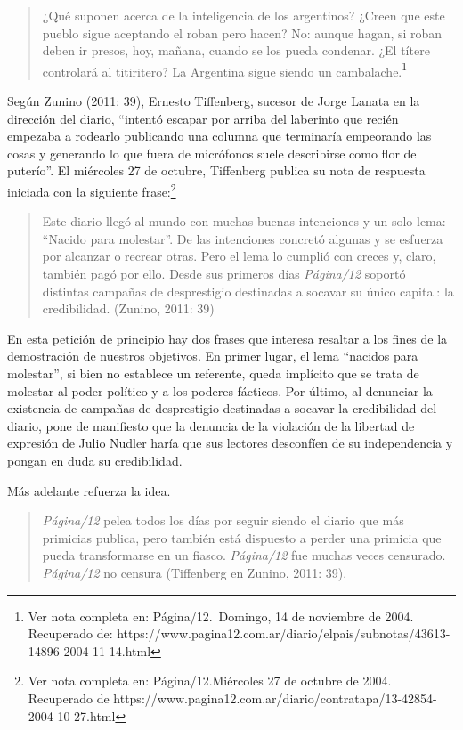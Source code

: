 {\begin{quote}
¿Qué suponen acerca de la inteligencia de los argentinos? ¿Creen que este pueblo sigue aceptando el roban pero hacen? No: aunque hagan, si roban deben ir presos, hoy, mañana, cuando se los pueda condenar. ¿El títere controlará al titiritero? La Argentina sigue siendo un cambalache.\footnote{Ver nota completa en: Página/12.~Domingo, 14 de noviembre de 2004. Recuperado de: https://www.pagina12.com.ar/diario/elpais/subnotas/43613-14896-2004-11-14.html}
\end{quote}

Según Zunino (2011: 39), Ernesto Tiffenberg, sucesor de Jorge Lanata en la dirección del diario, ``intentó escapar por arriba del laberinto que recién empezaba a rodearlo publicando una columna que terminaría empeorando las cosas y generando lo que fuera de micrófonos suele describirse como flor de puterío''. El miércoles 27 de octubre, Tiffenberg publica su nota de respuesta iniciada con la siguiente frase:\footnote{Ver nota completa en: Página/12.Miércoles 27 de octubre de 2004. Recuperado de https://www.pagina12.com.ar/diario/contratapa/13-42854-2004-10-27.html}

\begin{quote}
Este diario llegó al mundo con muchas buenas intenciones y un solo lema: ``Nacido para molestar''. De las intenciones concretó algunas y se esfuerza por alcanzar o recrear otras. Pero el lema lo cumplió con creces y, claro, también pagó por ello. Desde sus primeros días \emph{Página/12} soportó distintas campañas de desprestigio destinadas a socavar su único capital: la credibilidad. (Zunino, 2011: 39)
\end{quote}

En esta petición de principio hay dos frases que interesa resaltar a los fines de la demostración de nuestros objetivos. En primer lugar, el lema ``nacidos para molestar'', si bien no establece un referente, queda implícito que se trata de molestar al poder político y a los poderes fácticos. Por último, al denunciar la existencia de campañas de desprestigio destinadas a socavar la credibilidad del diario, pone de manifiesto que la denuncia de la violación de la libertad de expresión de Julio Nudler haría que sus lectores desconfíen de su independencia y pongan en duda su credibilidad.

Más adelante refuerza la idea.

\begin{quote}
\emph{Página/12} pelea todos los días por seguir siendo el diario que más primicias publica, pero también está dispuesto a perder una primicia que pueda transformarse en un fiasco. \emph{Página/12} fue muchas veces censurado. \emph{Página/12} no censura (Tiffenberg en Zunino, 2011: 39).
\end{quote}

}
